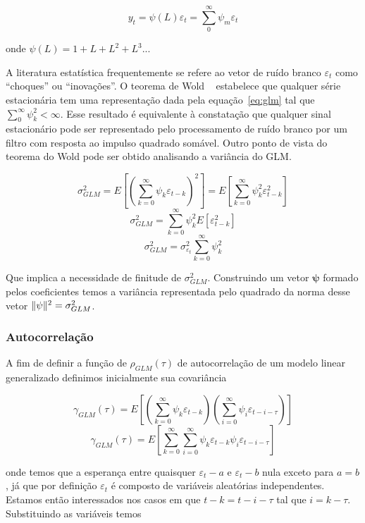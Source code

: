 \begin{equation}\label{eq:glm}
    y_t = \psi(L)\varepsilon_t = \sum^{\infty}_{0} \psi_m \varepsilon_t
\end{equation}

onde $\psi(L) = 1 + L + L^2 + L^3 ...$

A literatura estatística frequentemente se refere ao vetor de ruído branco
$\varepsilon_t$ como ``choques'' ou ``inovações''. O teorema de Wold
~\cite{wold} estabelece que qualquer série estacionária tem uma representação
dada pela equação~\ref{eq:glm} tal que $\sum^{\infty}_{0} \psi_k^2 < \infty$. Esse
resultado é equivalente à constatação que qualquer sinal estacionário pode ser
representado pelo processamento de ruído branco por um filtro com resposta ao
impulso quadrado somável. Outro ponto de vista do teorema do Wold pode ser
obtido analisando a variância do GLM.

$$\sigma^2_{GLM} = E\left[\left(\sum^{\infty}_{k=0} \psi_k \varepsilon_{t-k}\right)^2\right] = E\left[\sum^{\infty}_{k=0} \psi_k^2 \varepsilon_{t-k}^2\right]$$
$$\sigma^2_{GLM} = \sum^{\infty}_{k=0} \psi_k^2 E[\varepsilon_{t-k}^2]$$
$$\sigma^2_{GLM} = \sigma^2_{\varepsilon_t} \sum^{\infty}_{k=0} \psi_k^2 $$

Que implica a necessidade de finitude de $\sigma^2_{GLM}$. Construindo um
vetor $\mathbf{\psi}$ formado pelos coeficientes temos a variância representada
pelo quadrado da norma desse vetor $\lVert\psi\rVert^2 = \sigma^2_{GLM}$.

\subsubsection{Autocorrelação}

A fim de definir a função de $\rho_{GLM}(\tau)$ de autocorrelação de um modelo
linear generalizado definimos inicialmente sua covariância

$$\gamma_{GLM}(\tau) = E\left[\left(\sum^{\infty}_{k=0} \psi_k \varepsilon_{t-k}\right)\left(\sum^{\infty}_{i=0} \psi_i \varepsilon_{t-i-\tau}\right)  \right] $$
$$\gamma_{GLM}(\tau) = E\left[\sum^{\infty}_{k=0} \sum^{\infty}_{i=0} \psi_k \varepsilon_{t-k} \psi_i \varepsilon_{t-i-\tau}\right] $$

onde temos que a esperança entre quaisquer $\varepsilon_t-a$ e $\varepsilon_t-b$
nula exceto para $a = b$, já que por definição $\varepsilon_t$ é composto de
variáveis aleatórias independentes. Estamos então interessados nos casos em que
$t-k = t-i-\tau$ tal que $i = k - \tau$. Substituindo as variáveis temos

